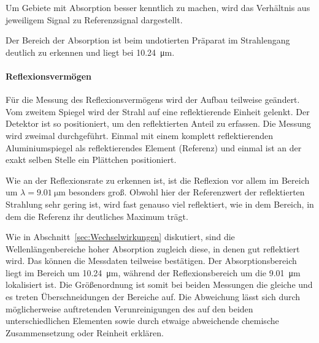 \documentclass[a4paper,twoside,final]{article}
\begin{document}


Um Gebiete mit Absorption besser kenntlich zu machen, wird das Verhältnis aus jeweiligem Signal zu Referenzsignal dargestellt.


\FloatBarrier
Der Bereich der Absorption ist beim undotierten Präparat im Strahlengang deutlich zu erkennen und liegt bei \SI{10.24}{\micro\meter}.

\newpage
\paragraph{Reflexionsvermögen}
Für die Messung des Reflexionsvermögens wird der Aufbau teilweise geändert. Vom zweitem Spiegel wird der Strahl auf eine reflektierende Einheit gelenkt. Der Detektor ist so positioniert, um den reflektierten Anteil zu erfassen. Die Messung wird zweimal durchgeführt. Einmal mit einem komplett reflektierenden Aluminiumspiegel als reflektierendes Element (Referenz) und einmal ist an der exakt selben Stelle ein  Plättchen positioniert.



\FloatBarrier
Wie an der Reflexionsrate zu erkennen ist, ist die Reflexion vor allem im Bereich um $\lambda = \SI{9.01}{\micro\meter}$ besonders groß. Obwohl hier der Referenzwert der reflektierten Strahlung sehr gering ist, wird fast genauso viel reflektiert, wie in dem Bereich, in dem die Referenz ihr deutliches Maximum trägt.

Wie in Abschnitt~\ref{sec:Wechselwirkungen} diskutiert, sind die Wellenlängenbereiche hoher Absorption zugleich diese, in denen gut reflektiert wird. Das können die Messdaten teilweise bestätigen. Der Absorptionsbereich liegt im Bereich um \SI{10.24}{\micro\meter}, während der Reflexionsbereich um die \SI{9.01}{\micro\meter} lokalisiert ist. Die Größenordnung ist somit bei beiden Messungen die gleiche und es treten Überschneidungen der Bereiche auf. Die Abweichung lässt sich durch möglicherweise auftretenden Verunreinigungen des  auf den beiden unterschiedlichen Elementen sowie durch etwaige abweichende chemische Zusammensetzung oder Reinheit erklären.
\clearpage
\end{document}
